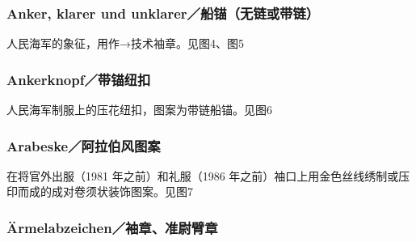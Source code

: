 \subsubsection*{Anker, klarer und unklarer／船锚（无链或带链）}

人民海军的象征，用作→技术袖章。见图4、图5

\subsubsection*{Ankerknopf／带锚纽扣}%

人民海军制服上的压花纽扣，图案为带链船锚。见图6

\subsubsection*{Arabeske／阿拉伯风图案}

在将官外出服（1981 年之前）和礼服（1986 年之前）袖口上用金色丝线绣制或压印而成的成对卷须状装饰图案。见图7

\subsubsection*{Ärmelabzeichen／袖章、准尉臂章}

